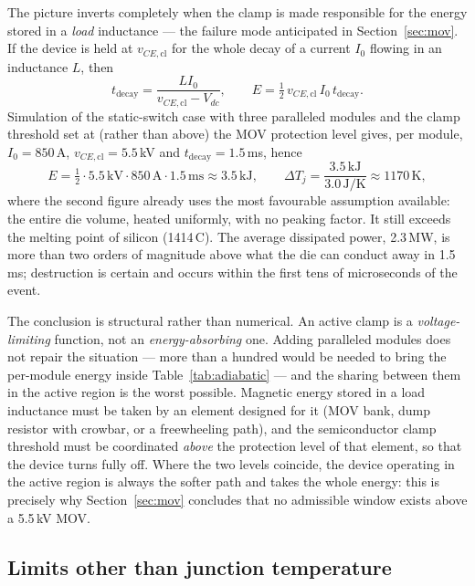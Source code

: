 \documentclass[11pt,a4paper]{article}
\begin{document}
The picture inverts completely when the clamp is made responsible for
the energy stored in a \emph{load} inductance --- the failure mode
anticipated in Section~\ref{sec:mov}. If the device is held at
$v_{CE,\mathrm{cl}}$ for the whole decay of a current $I_0$ flowing in
an inductance $L$, then
%
\begin{equation}
  t_{\mathrm{decay}} = \frac{L I_0}{v_{CE,\mathrm{cl}} - V_{dc}},
  \qquad
  E = \tfrac12\, v_{CE,\mathrm{cl}}\, I_0\, t_{\mathrm{decay}} .
  \label{eq:Eload}
\end{equation}
%
Simulation of the static-switch case with three paralleled modules and
the clamp threshold set at (rather than above) the MOV protection level
gives, per module, $I_0 = 850$\,A, $v_{CE,\mathrm{cl}} = 5.5$\,kV and
$t_{\mathrm{decay}} = 1.5$\,ms, hence
%
\begin{equation}
  E = \tfrac12\cdot5.5\,\mathrm{kV}\cdot850\,\mathrm{A}\cdot1.5\,\mathrm{ms}
  \approx 3.5\,\mathrm{kJ},
  \qquad
  \Delta T_j = \frac{3.5\,\mathrm{kJ}}{3.0\,\mathrm{J/K}}
  \approx 1170\,\mathrm{K},
\end{equation}
%
where the second figure already uses the most favourable assumption
available: the entire die volume, heated uniformly, with no peaking
factor. It still exceeds the melting point of silicon
(1414\,\textdegree C). The average dissipated power, 2.3\,MW, is more
than two orders of magnitude above what the die can conduct away in
1.5\,ms; destruction is certain and occurs within the first tens of
microseconds of the event.

The conclusion is structural rather than numerical. An active clamp is a
\emph{voltage-limiting} function, not an \emph{energy-absorbing} one.
Adding paralleled modules does not repair the situation --- more than a
hundred would be needed to bring the per-module energy inside
Table~\ref{tab:adiabatic} --- and the sharing between them in the active
region is the worst possible. Magnetic energy stored in a load
inductance must be taken by an element designed for it (MOV bank, dump
resistor with crowbar, or a freewheeling path), and the semiconductor
clamp threshold must be coordinated \emph{above} the protection level of
that element, so that the device turns fully off. Where the two levels
coincide, the device operating in the active region is always the softer
path and takes the whole energy: this is precisely why
Section~\ref{sec:mov} concludes that no admissible window exists above a
5.5\,kV MOV.

\subsection{Limits other than junction temperature}
\label{sec:otherlimits}
\end{document}
